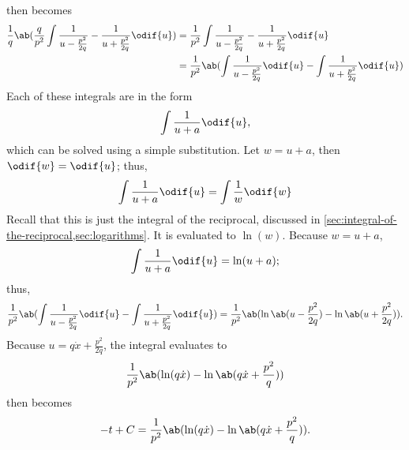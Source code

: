  then becomes
\begin{align}
	\frac{1}{q}\ab(\frac{q}{p^2}\int\frac{1}{u - \frac{p^2}{2q}} - \frac{1}{u + \frac{p^2}{2q}}\odif{u}) & = \frac{1}{p^2}\int\frac{1}{u - \frac{p^2}{2q}} - \frac{1}{u + \frac{p^2}{2q}}\odif{u}                            \\
	                                                                                                     & = \frac{1}{p^2}\ab(\int\frac{1}{u - \frac{p^2}{2q}}\odif{u} - \int\frac{1}{u + \frac{p^2}{2q}}\odif{u}) \nonumber
\end{align}
Each of these integrals are in the form
\begin{equation}
	\int\frac{1}{u + a}\odif{u},
\end{equation}
which can be solved using a simple substitution. Let $w = u + a$, then $\odif{w} = \odif{u}$; thus,
\begin{equation}
	\int\frac{1}{u + a}\odif{u} = \int\frac{1}{w}\odif{w}
\end{equation}
Recall that this is just the integral of the reciprocal, discussed in \cref{sec:integral-of-the-reciprocal,sec:logarithms}. It is evaluated to $\ln(w)$. Because $w = u + a$,
\begin{equation}
	\int\frac{1}{u + a}\odif{u} = \ln(u + a);
\end{equation}
thus,
\begin{equation}
	\frac{1}{p^2}\ab(\int\frac{1}{u - \frac{p^2}{2q}}\odif{u} - \int\frac{1}{u + \frac{p^2}{2q}}\odif{u}) = \frac{1}{p^2}\ab(\ln\ab(u - \frac{p^2}{2q}) - \ln\ab(u + \frac{p^2}{2q})).
\end{equation}
Because $u = q\dot{x} + \frac{p^2}{2q}$, the integral evaluates to
\begin{equation}
	\frac{1}{p^2}\ab(\ln(q\dot{x}) - \ln\ab(q\dot{x} + \frac{p^2}{q}))
\end{equation}
 then becomes
\begin{equation}
	- t + C = \frac{1}{p^2}\ab(\ln(q\dot{x}) - \ln\ab(q\dot{x} + \frac{p^2}{q})). \label{eq:drag-integral-3}
\end{equation}

